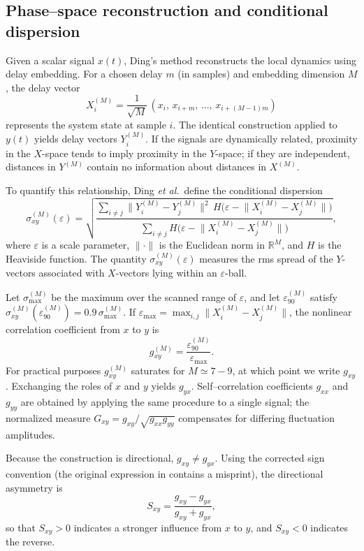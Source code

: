 \documentclass[12pt]{article}
\begin{document}
\subsection{ Phase–space reconstruction and conditional dispersion}

Given a scalar signal \(x(t)\), Ding’s method reconstructs the local dynamics using delay embedding.  
For a chosen delay \(m\) (in samples) and embedding dimension \(M\), the delay vector
\[
X_i^{(M)}
=
\frac{1}{\sqrt{M}}\,(x_i,\,x_{i+m},\,\dots,\,x_{i+(M-1)m})
\]
represents the system state at sample \(i\).  
The identical construction applied to \(y(t)\) yields delay vectors \(Y_i^{(M)}\).  
If the signals are dynamically related, proximity in the \(X\)-space tends to imply proximity in the \(Y\)-space; if they are independent, distances in \(Y^{(M)}\) contain no information about distances in \(X^{(M)}\).

To quantify this relationship, Ding \textit{et al.}\ define the conditional dispersion
\[
\sigma_{xy}^{(M)}(\varepsilon)
=
\sqrt{
\frac{
\sum_{i\neq j}
\lVert Y_i^{(M)}-Y_j^{(M)}\rVert^{2}
\,H\!\bigl(\varepsilon-\lVert X_i^{(M)}-X_j^{(M)}\rVert\bigr)
}{
\sum_{i\neq j}
H\!\bigl(\varepsilon-\lVert X_i^{(M)}-X_j^{(M)}\rVert\bigr)
}},
\]
where \(\varepsilon\) is a scale parameter, \(\lVert \cdot \rVert\) is the Euclidean norm in \(\mathbb{R}^M\),  
and \(H\) is the Heaviside function.  
The quantity \(\sigma_{xy}^{(M)}(\varepsilon)\) measures the rms spread of the \(Y\)-vectors associated with \(X\)-vectors lying within an \(\varepsilon\)-ball.

Let \(\sigma_{\max}^{(M)}\) be the maximum over the scanned range of \(\varepsilon\), and let \(\varepsilon_{90}^{(M)}\) satisfy \(\sigma_{xy}^{(M)}(\varepsilon_{90}^{(M)})=0.9\,\sigma_{\max}^{(M)}\).  
If \(\varepsilon_{\max}=\max_{i,j}\lVert X_i^{(M)}-X_j^{(M)}\rVert\), the nonlinear correlation coefficient from \(x\) to \(y\) is
\[
g_{xy}^{(M)}=\frac{\varepsilon_{90}^{(M)}}{\varepsilon_{\max}}.
\]
For practical purposes \(g_{xy}^{(M)}\) saturates for \(M\simeq 7\!-\!9\), at which point we write \(g_{xy}\).  
Exchanging the roles of \(x\) and \(y\) yields \(g_{yx}\).  
Self–correlation coefficients \(g_{xx}\) and \(g_{yy}\) are obtained by applying the same procedure to a single signal; the normalized measure \(G_{xy}=g_{xy}/\sqrt{g_{xx}g_{yy}}\) compensates for differing fluctuation amplitudes.

Because the construction is directional, \(g_{xy}\neq g_{yx}\).  
Using the corrected sign convention (the original expression in \cite{dingNonlinearRadialCorrelation1997} contains a misprint), the directional asymmetry is
\[
S_{xy}
=
\frac{g_{xy}-g_{yx}}{g_{xy}+g_{yx}},
\]
so that \(S_{xy}>0\) indicates a stronger influence from \(x\) to \(y\), and \(S_{xy}<0\) indicates the reverse.
\end{document}
